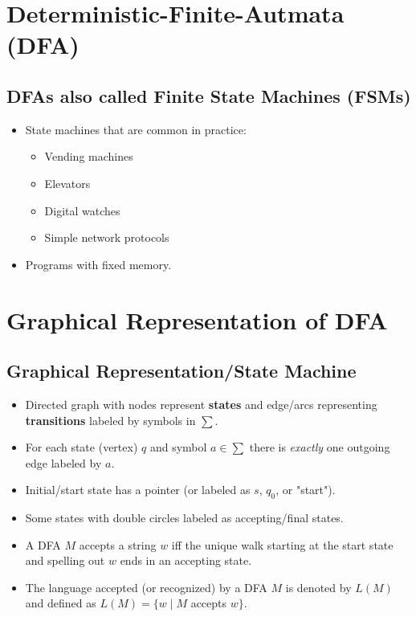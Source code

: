 \documentclass[12pt]{article}
\date{February 2, 2021}
\begin{document}
\maketitle

\section{Deterministic-Finite-Autmata (DFA)}

\subsection{DFAs also called Finite State Machines (FSMs)}
\begin{itemize}
    \item State machines that are common in practice:
    \begin{itemize}
        \item Vending machines
        \item Elevators
        \item Digital watches
        \item Simple network protocols
    \end{itemize}
    \item Programs with fixed memory.
\end{itemize}

\section{Graphical Representation of DFA}

\subsection{Graphical Representation/State Machine}
\begin{itemize}
    \item Directed graph with nodes represent \textbf{states} and edge/arcs representing \textbf{transitions} labeled by symbols in $\sum$.
    \item For each state (vertex) $q$ and symbol $a \in \sum$ there is \textit{exactly} one outgoing edge labeled by $a$.
    \item Initial/start state has a pointer (or labeled as $s$, $q_0$, or "start").
    \item Some states with double circles labeled as accepting/final states.
    \item A DFA $M$ accepts a string $w$ iff the unique walk starting at the start state and spelling out $w$ ends in an accepting state.
    \item The language accepted (or recognized) by a DFA $M$ is denoted by $L(M)$ and defined as $L(M) = \{ w \mid M$ accepts $w \}$.
\end{itemize}
\end{document}

